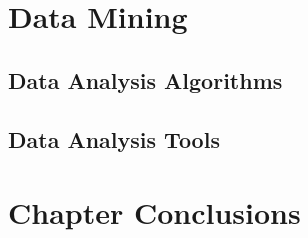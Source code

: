 \section{Data Mining}\label{sec:mlearning}

\subsection{Data Analysis Algorithms}\label{sec:minalgo}

\subsection{Data Analysis Tools}\label{sec:mintools}

\section{Chapter Conclusions}
